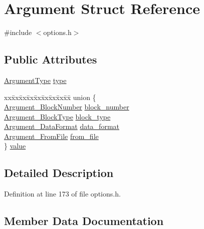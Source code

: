 \hypertarget{struct_argument}{}\section{Argument Struct Reference}
\label{struct_argument}


{\ttfamily \#include $<$options.\+h$>$}

\subsection*{Public Attributes}
\begin{DoxyCompactItemize}
\item 
\hyperlink{libflac_2src_2metaflac_2options_8h_aa15f3f718db408445afc1b93c12294c5}{Argument\+Type} \hyperlink{struct_argument_a94fa591eeb1e00b971de97ed04cb89a6}{type}
\item 
\begin{tabbing}
xx\=xx\=xx\=xx\=xx\=xx\=xx\=xx\=xx\=\kill
union \{\\
\>\hyperlink{struct_argument___block_number}{Argument\_BlockNumber} \hyperlink{struct_argument_a049f87ad1e39070a2c97180b71f33374}{block\_number}\\
\>\hyperlink{struct_argument___block_type}{Argument\_BlockType} \hyperlink{struct_argument_a696d94e74365133c31b44ed5f88285a3}{block\_type}\\
\>\hyperlink{struct_argument___data_format}{Argument\_DataFormat} \hyperlink{struct_argument_ab0be001da85138263582652cf41c6edb}{data\_format}\\
\>\hyperlink{struct_argument___from_file}{Argument\_FromFile} \hyperlink{struct_argument_a920fcadf9f322c449651b54193e14ca1}{from\_file}\\
\} \hyperlink{struct_argument_ac4443c3ab6f2f1aa4970cf9eba6a8174}{value}\\

\end{tabbing}\end{DoxyCompactItemize}


\subsection{Detailed Description}


Definition at line 173 of file options.\+h.



\subsection{Member Data Documentation}
